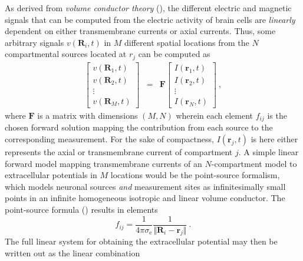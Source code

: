 As derived from \textit{volume conductor theory} (),
the different electric and magnetic signals that can be computed from the electric activity of brain cells are \textit{linearly} dependent on either transmembrane currents or axial currents.
Thus, some arbitrary signals $v(\mathbf{R}_i, t)$ in $M$ different spatial locations from the $N$ compartmental sources located at $r_j$ can be computed as
%
\begin{eqnarray}
\begin{bmatrix}
v(\mathbf{R}_1, t) \\
v(\mathbf{R}_2, t) \\
\vdots \\
v(\mathbf{R}_M, t)
\end{bmatrix}
&=& \mathbf{F}
\begin{bmatrix}
I(\mathbf{r}_1, t) \\
I(\mathbf{r}_2, t) \\
\vdots \\
I(\mathbf{r}_N, t)
\end{bmatrix} ~,
\end{eqnarray}
%
where $\mathbf{F}$ is a matrix with dimensions $(M, N)$ wherein each element $f_{ij}$ is the chosen forward solution mapping the contribution from each source to the corresponding measurement.
For the sake of compactness, $I(\mathbf{r}_j, t)$ is here either represents the axial or transmembrane current of compartment $j$.
A simple linear forward model mapping transmembrane currents of an $N$-compartment model to extracellular potentials in $M$ locations would be the point-source formalism,
which models neuronal sources \textit{and} measurement sites as infinitesimally small points in an infinite homogeneous isotropic and linear volume conductor.
The point-source formula () results in elements
%
\begin{equation}
f_{ij} = \frac{1}{4\pi\sigma_\mathrm{e}}\frac{1}{\Vert\mathbf{R}_i - \mathbf{r}_j\Vert}  ~.
\end{equation}
%
The full linear system for obtaining the extracellular potential may then be written out as the linear combination
%
